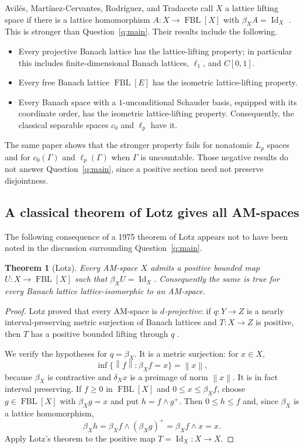 \documentclass[11pt]{article}
\newtheorem{theorem}{Theorem}[section]
\newcommand{\FBL}{\operatorname{FBL}}
\newcommand{\Id}{\operatorname{Id}}
\newcommand{\norm}[1]{\left\lVert #1\right\rVert}
\begin{document}
Avil\'es, Mart\'inez-Cervantes, Rodr\'iguez, and Tradacete call $X$ a lattice
lifting space if there is a lattice homomorphism
$A:X\to\FBL[X]$ with $\beta_XA=\Id_X$ \cite{AvilesEtAl2022}.  This is stronger
than Question~\ref{q:main}.  Their results include the following.
\begin{itemize}[leftmargin=2em]
\item Every projective Banach lattice has the lattice-lifting property; in
particular this includes finite-dimensional Banach lattices, $\ell_1$, and
$C[0,1]$.
\item Every free Banach lattice $\FBL[E]$ has the isometric lattice-lifting
property.
\item Every Banach space with a $1$-unconditional Schauder basis, equipped
with its coordinate order, has the isometric lattice-lifting property.
Consequently, the classical separable spaces $c_0$ and $\ell_p$ have it.
\end{itemize}
The same paper shows that the stronger property fails for nonatomic $L_p$
spaces and for $c_0(\Gamma)$ and $\ell_p(\Gamma)$ when $\Gamma$ is uncountable.
Those negative results do not answer Question~\ref{q:main}, since a positive section
need not preserve disjointness.

\subsection{A classical theorem of Lotz gives all AM-spaces}

The following consequence of a 1975 theorem of Lotz appears not to have been
noted in the discussion surrounding Question~\ref{q:main}.

\begin{theorem}[Lotz]\label{thm:lotz}
Every AM-space $X$ admits a positive bounded map
$U:X\to\FBL[X]$ such that $\beta_XU=\Id_X$.
Consequently the same is true for every Banach lattice lattice-isomorphic to
an AM-space.
\end{theorem}

\begin{proof}
Lotz proved that every AM-space is \emph{$d$-projective}: if
$q:Y\to Z$ is a nearly interval-preserving metric surjection of Banach
lattices and $T:X\to Z$ is positive, then $T$ has a positive bounded lifting
through $q$ \cite[Proposition~3.3]{Lotz1975}.

We verify the hypotheses for $q=\beta_X$.  It is a metric surjection: for
$x\in X$,
\[
 \inf\{\norm f:\beta_Xf=x\}=\norm x,
\]
because $\beta_X$ is contractive and $\delta_Xx$ is a preimage of norm
$\norm x$.  It is in fact interval preserving.  If $f\geq0$ in $\FBL[X]$ and
$0\leq x\leq\beta_Xf$, choose $g\in\FBL[X]$ with $\beta_Xg=x$ and put
$h=f\wedge g^+$.  Then $0\leq h\leq f$ and, since $\beta_X$ is a lattice
homomorphism,
\[
 \beta_Xh=\beta_Xf\wedge(\beta_Xg)^+
 =\beta_Xf\wedge x=x.
\]
Apply Lotz's theorem to the positive map $T=\Id_X:X\to X$.
\end{proof}
\end{document}
